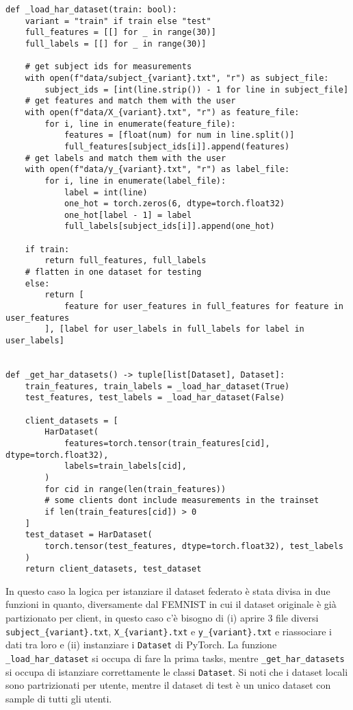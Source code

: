 \clearpage
\begin{lstlisting}
def _load_har_dataset(train: bool):
    variant = "train" if train else "test"
    full_features = [[] for _ in range(30)]
    full_labels = [[] for _ in range(30)]

    # get subject ids for measurements
    with open(f"data/subject_{variant}.txt", "r") as subject_file:
        subject_ids = [int(line.strip()) - 1 for line in subject_file]
    # get features and match them with the user
    with open(f"data/X_{variant}.txt", "r") as feature_file:
        for i, line in enumerate(feature_file):
            features = [float(num) for num in line.split()]
            full_features[subject_ids[i]].append(features)
    # get labels and match them with the user
    with open(f"data/y_{variant}.txt", "r") as label_file:
        for i, line in enumerate(label_file):
            label = int(line)
            one_hot = torch.zeros(6, dtype=torch.float32)
            one_hot[label - 1] = label
            full_labels[subject_ids[i]].append(one_hot)

    if train:
        return full_features, full_labels
    # flatten in one dataset for testing
    else:
        return [
            feature for user_features in full_features for feature in user_features
        ], [label for user_labels in full_labels for label in user_labels]


def _get_har_datasets() -> tuple[list[Dataset], Dataset]:
    train_features, train_labels = _load_har_dataset(True)
    test_features, test_labels = _load_har_dataset(False)

    client_datasets = [
        HarDataset(
            features=torch.tensor(train_features[cid], dtype=torch.float32),
            labels=train_labels[cid],
        )
        for cid in range(len(train_features))
        # some clients dont include measurements in the trainset
        if len(train_features[cid]) > 0
    ]
    test_dataset = HarDataset(
        torch.tensor(test_features, dtype=torch.float32), test_labels
    )
    return client_datasets, test_dataset
\end{lstlisting}

In questo caso la logica per istanziare il dataset federato è stata 
divisa in due funzioni in quanto, diversamente dal FEMNIST in cui il 
dataset originale è già partizionato per client, in questo caso c'è 
bisogno di (i) aprire 3 file diversi \texttt{subject\_\{variant\}.txt}, 
\texttt{X\_\{variant\}.txt} e \texttt{y\_\{variant\}.txt} e riassociare 
i dati tra loro e (ii) instanziare i \texttt{Dataset} di PyTorch.
La funzione \texttt{\_load\_har\_dataset} si occupa di fare la prima tasks,
mentre \texttt{\_get\_har\_datasets} si occupa di istanziare correttamente le classi 
\texttt{Dataset}. Si noti che i dataset locali sono partrizionati per 
utente, mentre il dataset di test è un unico dataset con sample di 
tutti gli utenti.